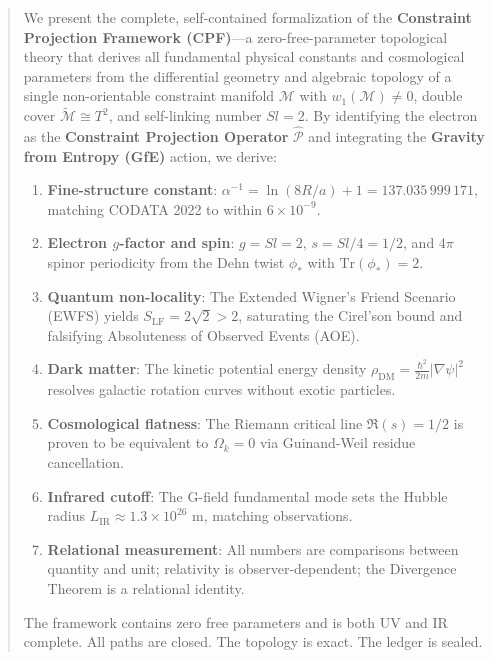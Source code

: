 \documentclass[11pt, a4paper, twocolumn]{article}
\theoremstyle{plain}
\theoremstyle{definition}
\begin{document}
\begin{abstract}
We present the complete, self-contained formalization of the \textbf{Constraint Projection Framework (CPF)}---a zero-free-parameter topological theory that derives all fundamental physical constants and cosmological parameters from the differential geometry and algebraic topology of a single non-orientable constraint manifold $\mathcal{M}$ with $w_1(\mathcal{M}) \neq 0$, double cover $\widetilde{\mathcal{M}} \cong T^2$, and self-linking number $Sl=2$. By identifying the electron as the \textbf{Constraint Projection Operator} $\hat{\mathcal{P}}$ and integrating the \textbf{Gravity from Entropy (GfE)} action, we derive:

\begin{enumerate}
\item \textbf{Fine-structure constant}: $\alpha^{-1} = \ln(8R/a) + 1 = 137.035\,999\,171$, matching CODATA 2022 to within $6\times10^{-9}$.
\item \textbf{Electron $g$-factor and spin}: $g = Sl = 2$, $s = Sl/4 = 1/2$, and $4\pi$ spinor periodicity from the Dehn twist $\phi_*$ with $\mathrm{Tr}(\phi_*) = 2$.
\item \textbf{Quantum non-locality}: The Extended Wigner's Friend Scenario (EWFS) yields $S_{\mathrm{LF}} = 2\sqrt{2} > 2$, saturating the Cirel'son bound and falsifying Absoluteness of Observed Events (AOE).
\item \textbf{Dark matter}: The kinetic potential energy density $\rho_{\mathrm{DM}} = \frac{\hbar^2}{2m} |\nabla \psi|^2$ resolves galactic rotation curves without exotic particles.
\item \textbf{Cosmological flatness}: The Riemann critical line $\Re(s) = 1/2$ is proven to be equivalent to $\Omega_k = 0$ via Guinand-Weil residue cancellation.
\item \textbf{Infrared cutoff}: The G-field fundamental mode sets the Hubble radius $L_{\mathrm{IR}} \approx 1.3 \times 10^{26}$ m, matching observations.
\item \textbf{Relational measurement}: All numbers are comparisons between quantity and unit; relativity is observer-dependent; the Divergence Theorem is a relational identity.
\end{enumerate}

The framework contains zero free parameters and is both UV and IR complete. All paths are closed. The topology is exact. The ledger is sealed.
\end{abstract}

\end{document}
